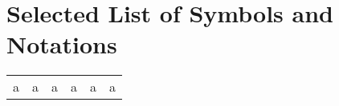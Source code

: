 \chapter*{Selected List of Symbols and Notations}
\label{chap:los}

\setlength\tabcolsep{0pt}
\begin{tabular*}{\linewidth}{@{\extracolsep{\fill}} cccccc }
	a & a & a & a & a & a
\end{tabular*}
